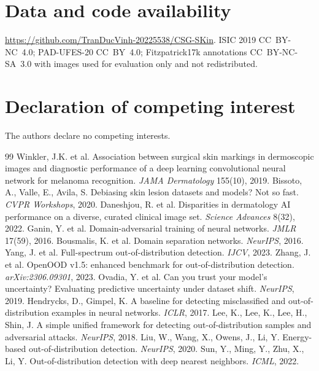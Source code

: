 \documentclass[11pt,a4paper]{article}
\newcommand{\repolink}{\url{https://github.com/TranDucVinh-20225538/CSG-SKin}}
\begin{document}
\section*{Data and code availability}
\repolink. ISIC 2019 CC~BY-NC~4.0; PAD-UFES-20 CC~BY~4.0;
Fitzpatrick17k annotations CC~BY-NC-SA~3.0 with images used for evaluation
only and not redistributed.

\section*{Declaration of competing interest}
The authors declare no competing interests.

\begin{thebibliography}{99}
 Winkler, J.K. et al. Association between surgical skin
markings in dermoscopic images and diagnostic performance of a deep learning
convolutional neural network for melanoma recognition. \emph{JAMA Dermatology}
155(10), 2019.
 Bissoto, A., Valle, E., Avila, S. Debiasing skin lesion
datasets and models? Not so fast. \emph{CVPR Workshops}, 2020.
 Daneshjou, R. et al. Disparities in dermatology AI
performance on a diverse, curated clinical image set. \emph{Science Advances}
8(32), 2022.
 Ganin, Y. et al. Domain-adversarial training of neural
networks. \emph{JMLR} 17(59), 2016.
 Bousmalis, K. et al. Domain separation networks.
\emph{NeurIPS}, 2016.
 Yang, J. et al. Full-spectrum out-of-distribution
detection. \emph{IJCV}, 2023.
 Zhang, J. et al. OpenOOD v1.5: enhanced benchmark for
out-of-distribution detection. \emph{arXiv:2306.09301}, 2023.
 Ovadia, Y. et al. Can you trust your model's
uncertainty? Evaluating predictive uncertainty under dataset shift.
\emph{NeurIPS}, 2019.
 Hendrycks, D., Gimpel, K. A baseline for detecting
misclassified and out-of-distribution examples in neural networks.
\emph{ICLR}, 2017.
 Lee, K., Lee, K., Lee, H., Shin, J. A simple unified framework
for detecting out-of-distribution samples and adversarial attacks.
\emph{NeurIPS}, 2018.
 Liu, W., Wang, X., Owens, J., Li, Y. Energy-based
out-of-distribution detection. \emph{NeurIPS}, 2020.
 Sun, Y., Ming, Y., Zhu, X., Li, Y. Out-of-distribution
detection with deep nearest neighbors. \emph{ICML}, 2022.

\end{thebibliography}
\end{document}
